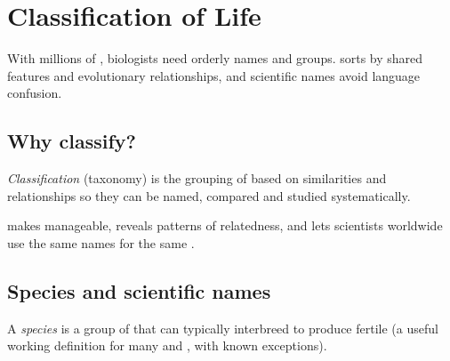 \chapter{Classification of Life}\label{ch:g6:classification}

With millions of , biologists need orderly names and groups.
 sorts  by shared features and evolutionary
relationships, and scientific names avoid language confusion.

\section{Why classify?}

\begin{definition}[Classification]\label{def:g6:classification:def}
\emph{Classification} (taxonomy) is the grouping
of  based on similarities and relationships so they can be
named, compared and studied systematically.
\end{definition}

\begin{proposition}[Purpose]\label{prop:g6:classification:why}
 makes  manageable, reveals patterns of
relatedness, and lets scientists worldwide use the same names for the
same .
\end{proposition}
\admitted


\section{Species and scientific names}

\begin{definition}[Species]\label{def:g6:classification:species}
A \emph{species} is a group of  that can
typically interbreed to produce fertile  (a useful working
definition for many  and , with known exceptions).
\end{definition}


